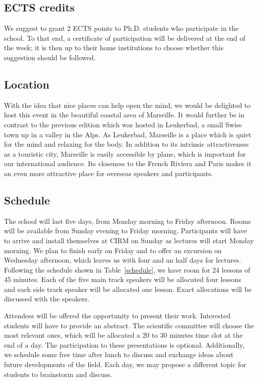 \documentclass[a4paper]{scrartcl}
\begin{document}
\subsection{ECTS credits}

We suggest to grant 2 ECTS points to Ph.D. students who participate in the
school. To that end, a certificate of participation will be delivered at the end
of the week; it is then up to their home institutions to choose whether this
suggestion should be followed.

\subsection{Location}

With the idea that nice places can help open the mind, we would be delighted to
host this event in the beautiful coastal area of Marseille. It would further be
in contrast to the previous edition which was hosted in Leukerbad, a small Swiss
town up in a valley in the Alps. As Leukerbad, Marseille is a place which is
quiet for the mind and relaxing for the body. 
In addition to its intrinsic attractiveness as a touristic city, Marseille is
easily accessible by plane, which is important for our international audience.
Its closeness to the French Riviera and Paris makes it an even more attractive
place for overseas speakers and participants.

\subsection{Schedule}

The school will last five days, from Monday morning to Friday afternoon. Rooms
will be available from Sunday evening to Friday morning. Participants will have
to arrive and install themselves at CIRM on Sunday as lectures will start Monday
morning. We plan to finish early on Friday and to offer an excursion on
Wednesday afternoon, which leaves us with four and an half days for lectures.
Following the schedule shown in Table~\ref{schedule}, we have room for 24
lessons of 45 minutes. Each of the five main track speakers will be allocated
four lessons and each side track speaker will be allocated one lesson.
Exact allocations will be discussed with the speakers.

Attendees will be offered the opportunity to present their work. Interested
students will have to provide an abstract. The scientific committee will choose
the most relevant ones, which will be allocated a 20 to 30 minutes time slot at
the end of a day. The participation to these presentations is optional.
Additionally, we schedule some free time after lunch to discuss and exchange
ideas about future developments of the field. Each day, we may propose a
different topic for students to brainstorm and discuss.
\end{document}
